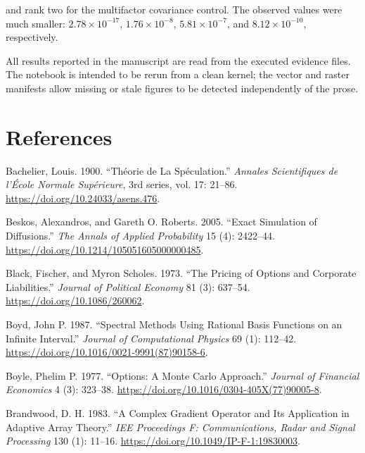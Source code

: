 \documentclass[
  english,
  10pt,
  letterpaper,
  DIV=11,
  numbers=noendperiod]{scrartcl}
\newlength{\cslhangindent}
\newenvironment{CSLReferences}[2] %
 {\begin{list}{}{%
  \setlength{\itemindent}{0pt}
  \setlength{\leftmargin}{0pt}
  \setlength{\parsep}{0pt}
  \ifodd #1
   \setlength{\leftmargin}{\cslhangindent}
   \setlength{\itemindent}{-1\cslhangindent}
  \fi
  \setlength{\itemsep}{#2\baselineskip}}}
 {\end{list}}
\theoremstyle{definition}
\theoremstyle{plain}
\theoremstyle{plain}
\theoremstyle{remark}
\begin{document}
and rank two for the multifactor covariance control. The observed values
were much smaller: \(2.78\times10^{-17}\), \(1.76\times10^{-8}\),
\(5.81\times10^{-7}\), and \(8.12\times10^{-10}\), respectively.

All results reported in the manuscript are read from the executed
evidence files. The notebook is intended to be rerun from a clean
kernel; the vector and raster manifests allow missing or stale figures
to be detected independently of the prose.

\section*{References}\label{references}

\protect{}\label{refs}
\begin{CSLReferences}{1}{1}
Bachelier, Louis. 1900. {``Th{é}orie de La Sp{é}culation.''}
\emph{Annales Scientifiques de l'{É}cole Normale Sup{é}rieure}, 3rd
series, vol. 17: 21--86. \url{https://doi.org/10.24033/asens.476}.

Beskos, Alexandros, and Gareth O. Roberts. 2005. {``Exact Simulation of
Diffusions.''} \emph{The Annals of Applied Probability} 15 (4):
2422--44. \url{https://doi.org/10.1214/105051605000000485}.

Black, Fischer, and Myron Scholes. 1973. {``The Pricing of Options and
Corporate Liabilities.''} \emph{Journal of Political Economy} 81 (3):
637--54. \url{https://doi.org/10.1086/260062}.

Boyd, John P. 1987. {``Spectral Methods Using Rational Basis Functions
on an Infinite Interval.''} \emph{Journal of Computational Physics} 69
(1): 112--42. \url{https://doi.org/10.1016/0021-9991(87)90158-6}.

Boyle, Phelim P. 1977. {``Options: A Monte Carlo Approach.''}
\emph{Journal of Financial Economics} 4 (3): 323--38.
\url{https://doi.org/10.1016/0304-405X(77)90005-8}.

Brandwood, D. H. 1983. {``A Complex Gradient Operator and Its
Application in Adaptive Array Theory.''} \emph{IEE Proceedings F:
Communications, Radar and Signal Processing} 130 (1): 11--16.
\url{https://doi.org/10.1049/IP-F-1:19830003}.


\end{CSLReferences}
\end{document}
